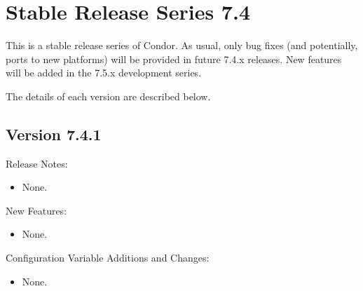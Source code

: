 
\section{\label{sec:History-7-4}Stable Release Series 7.4}

This is a stable release series of Condor.
As usual, only bug fixes (and potentially, ports to new platforms)
will be provided in future 7.4.x releases.
New features will be added in the 7.5.x development series.

The details of each version are described below.

\subsection*{\label{sec:New-7-4-1}Version 7.4.1}

\noindent Release Notes:

\begin{itemize}

\item None.

\end{itemize}


\noindent New Features:

\begin{itemize}

\item None.

\end{itemize}

\noindent Configuration Variable Additions and Changes:

\begin{itemize}

\item None.

\end{itemize}


